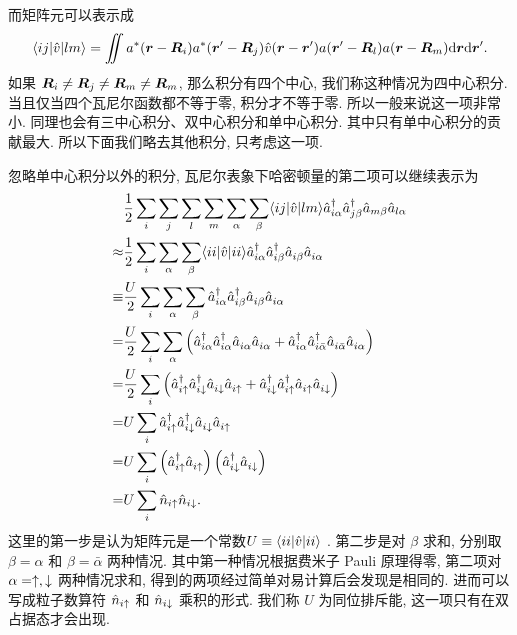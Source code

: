 而矩阵元可以表示成
\begin{equation}
   \langle ij|\hat v|lm \rangle=\iint a^*(\boldsymbol{r}-\boldsymbol{R}_i)a^*(\boldsymbol{r}'-\boldsymbol{R}_j)\hat v(\boldsymbol{r}-\boldsymbol{r}')a(\boldsymbol{r}'-\boldsymbol{R}_l)a(\boldsymbol{r}-\boldsymbol{R}_m)\mathrm{d}\boldsymbol{r}\mathrm{d}\boldsymbol{r}'. 
\end{equation}
如果 $\boldsymbol{R}_i\ne \boldsymbol{R}_j\ne \boldsymbol{R}_m\ne \boldsymbol{R}_m$, 那么积分有四个中心, 我们称这种情况为四中心积分. 当且仅当四个瓦尼尔函数都不等于零, 积分才不等于零. 所以一般来说这一项非常小. 同理也会有三中心积分、双中心积分和单中心积分. 其中只有单中心积分的贡献最大. 所以下面我们略去其他积分, 只考虑这一项. 

忽略单中心积分以外的积分, 瓦尼尔表象下哈密顿量的第二项可以继续表示为
 \begin{align}
{}&\frac{1}{2}\sum_{i}\sum_{j}\sum_{l}\sum_{m}\sum_{\alpha}\sum_{\beta}\langle ij |\hat v|lm\rangle \hat{a}^{\dagger}_{i\alpha}\hat{a}^{\dagger}_{j\beta}\hat{a}_{m\beta}\hat{a}_{l\alpha}\nonumber\\    
\approx & \frac{1}{2}\sum_i\sum_\alpha\sum_\beta\langle ii|\hat v|ii \rangle \hat a_{i\alpha}^\dagger \hat a_{i\beta}^\dagger \hat a_{i\beta}^{} \hat a_{i\alpha}^{}\nonumber\\
      \equiv& \frac{U}{2}\sum_i\sum_\alpha\sum_\beta\hat a_{i\alpha}^\dagger \hat a_{i\beta}^\dagger \hat a_{i\beta}^{}\hat a_{i\alpha}^{}\nonumber\\
      =&\frac{U}{2}\sum_i\sum_\alpha\left( \hat a_{i\alpha}^\dagger \hat a_{i\alpha}^\dagger \hat a_{i\alpha}^{} \hat a_{i\alpha}^{} +\hat a_{i\alpha}^{\dagger}\hat a_{i\bar\alpha}^\dagger \hat a_{i\bar\alpha}^{}\hat a_{i\alpha}^{} \right)\nonumber\\
      =&\frac{U}{2}\sum_i\left( \hat a_{i\uparrow}^\dagger \hat a_{i\downarrow}^\dagger \hat a_{i\downarrow}^{}\hat a_{i\uparrow}^{}+\hat a_{i\downarrow}^\dagger \hat a_{i\uparrow}^\dagger\hat a_{i\uparrow}^{}\hat a_{i\downarrow}^{} \right)\nonumber\\
      =&U\sum_i\hat a_{i\uparrow}^\dagger \hat a_{i\downarrow}^\dagger \hat a_{i\downarrow}^{}\hat a_{i\uparrow}^{}\nonumber\\
      =&U\sum_i\left( \hat a_{i\uparrow}^\dagger \hat a_{i\uparrow}^{} \right)\left( \hat a_{i\downarrow}^\dagger \hat a_{i\downarrow}^{} \right)\nonumber\\
      =&U\sum_i\hat n_{i\uparrow}\hat n_{i\downarrow}. 
   \end{align}
这里的第一步是认为矩阵元是一个常数$U\equiv \langle ii|\hat v|ii \rangle$ . 第二步是对 $\beta$ 求和, 分别取 $\beta=\alpha$ 和 $\beta=\bar \alpha$ 两种情况. 其中第一种情况根据费米子 Pauli 原理得零, 第二项对 $\alpha=\uparrow, \downarrow$ 两种情况求和, 得到的两项经过简单对易计算后会发现是相同的. 进而可以写成粒子数算符 $\hat n_{i\uparrow}$ 和 $\hat n_{i\downarrow}$ 乘积的形式. 
我们称 $U$ 为同位排斥能, 这一项只有在双占据态才会出现. 

